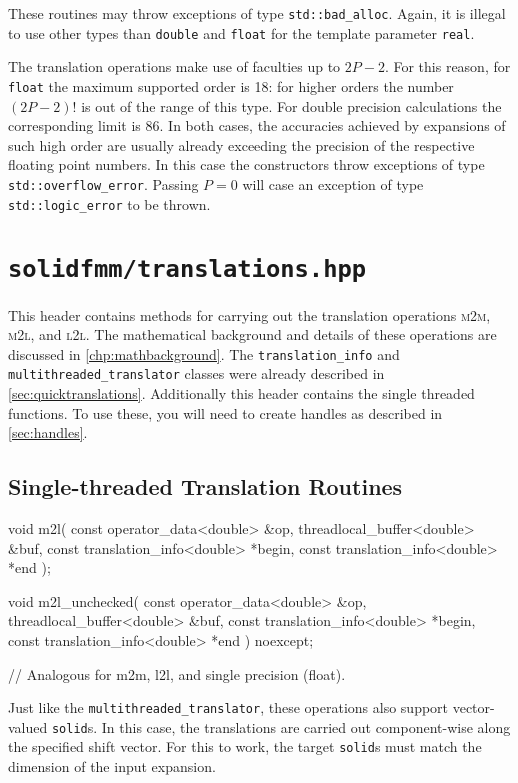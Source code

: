 \documentclass{scrbook}
\newcommand{\MtoM}{\textsc{m2m}}
\newcommand{\MtoL}{\textsc{m2l}}
\newcommand{\LtoL}{\textsc{l2l}}
\begin{document}
These routines may throw exceptions of type \lstinline|std::bad_alloc|. Again,
it is illegal to use other types than \lstinline[style=cpp]|double| and
\lstinline[style=cpp]|float| for the template parameter \lstinline|real|.

The translation operations make use of faculties up to $2P-2$. For this
reason, for \lstinline[style=cpp]|float| the maximum supported order is 18:
for higher orders the number $(2P-2)!$ is out of the range of this type. For
double precision calculations the corresponding limit is 86. In both cases,
the accuracies achieved by expansions of such high order are usually already
exceeding the precision of the respective floating point numbers. In this
case the constructors throw exceptions of type \lstinline|std::overflow_error|.
Passing $P=0$ will case an exception of type \lstinline|std::logic_error| to be
thrown.


\section{\texttt{solidfmm/translations.hpp}}\label{sec:singlethreadedtrans}
This header contains methods for carrying out the translation operations
\MtoM, \MtoL, and \LtoL. The mathematical background and details of these
operations are discussed in \cref{chp:mathbackground}. The 
\lstinline|translation_info| and \lstinline|multithreaded_translator| classes
were already described in \cref{sec:quicktranslations}. Additionally this
header contains the single threaded functions. To use these, you will need to
create handles as described in \cref{sec:handles}.

\subsection{Single-threaded Translation Routines}
\begin{cppcode*}
void           m2l( const operator_data<double> &op,
                          threadlocal_buffer<double> &buf,
                    const translation_info<double> *begin,
                    const translation_info<double> *end );

void m2l_unchecked( const operator_data<double> &op, 
                          threadlocal_buffer<double> &buf,
                    const translation_info<double> *begin,
                    const translation_info<double> *end ) noexcept;

// Analogous for m2m, l2l, and single precision (float).
\end{cppcode*}
Just like the \lstinline|multithreaded_translator|, these operations also
support vector-valued \lstinline|solid|s. In this case, the translations are
carried out component-wise along the specified shift vector. For this to work,
the target \lstinline|solid|s must match the dimension of the input expansion.
\end{document}
